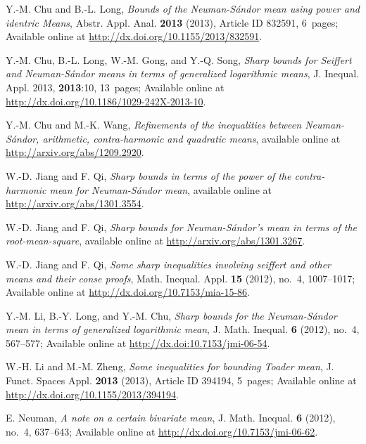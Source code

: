 \documentclass[reqno,a4paper]{amsart}
\numberwithin{equation}{section}
\theoremstyle{plain}
\theoremstyle{remark}
\begin{document}
\begin{thebibliography}{99}

Y.-M. Chu and B.-L. Long, \textit{Bounds of the Neuman-S\'andor mean using power and identric Means}, Abstr. Appl. Anal. \textbf{2013} (2013), Article ID 832591, 6~pages; Available online at \url{http://dx.doi.org/10.1155/2013/832591}.

Y.-M. Chu, B.-L. Long, W.-M. Gong, and Y.-Q. Song, \textit{Sharp bounds for Seiffert and Neuman-S\'andor means in terms of generalized logarithmic means}, J. Inequal. Appl. 2013, \textbf{2013}:10, 13~pages; Available online at \url{http://dx.doi.org/10.1186/1029-242X-2013-10}.

Y.-M. Chu and M.-K. Wang, \textit{Refinements of the inequalities between Neuman-S\'andor, arithmetic, contra-harmonic and quadratic means}, available online at \url{http://arxiv.org/abs/1209.2920}.

W.-D. Jiang and F. Qi, \textit{Sharp bounds in terms of the power of the contra-harmonic mean for Neuman-S\'andor mean}, available online at \url{http://arxiv.org/abs/1301.3554}.

W.-D. Jiang and F. Qi, \textit{Sharp bounds for Neuman-S\'andor's mean in terms of the root-mean-square}, available online at \url{http://arxiv.org/abs/1301.3267}.

W.-D. Jiang and F. Qi, \textit{Some sharp inequalities involving seiffert and other means and their conse proofs}, Math. Inequal. Appl. \textbf{15} (2012), no.~4, 1007\nobreakdash--1017; Available online at \url{http://dx.doi.org/10.7153/mia-15-86}.

Y.-M. Li, B.-Y. Long, and Y.-M. Chu, \textit{Sharp bounds for the Neuman-S\'andor mean in terms of generalized logarithmic mean}, J. Math. Inequal. \textbf{6} (2012), no.~4, 567\nobreakdash--577; Available online at \url{http://dx.doi:10.7153/jmi-06-54}.

W.-H. Li and M.-M. Zheng, \textit{Some inequalities for bounding Toader mean}, J. Funct. Spaces Appl. \textbf{2013} (2013), Article ID 394194, 5~pages; Available online at \url{http://dx.doi.org/10.1155/2013/394194}.

E. Neuman, \textit{A note on a certain bivariate mean}, J. Math. Inequal. \textbf{6} (2012), no.~4, 637\nobreakdash--643; Available online at \url{http://dx.doi.org/10.7153/jmi-06-62}.


\end{thebibliography}
\end{document}
